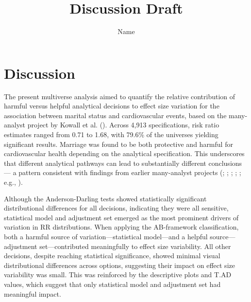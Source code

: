 \documentclass[
  man,
  floatsintext,
  longtable,
  nolmodern,
  notxfonts,
  notimes,
  colorlinks=true,linkcolor=blue,citecolor=blue,urlcolor=blue]{apa7}
\title{Discussion Draft}
\author{Name}
\affiliation{
{Universiteit}}
\newlength{\cslhangindent}
\begin{document}
\maketitle




\setlength\LTleft{0pt}



\ifdefined\Shaded\renewenvironment{Shaded}{\begin{snugshade}\begin{singlespace}}{\end{singlespace}\end{snugshade}}\fi

\setlength{\cslhangindent}{0.5in}

\section{Discussion}\label{discussion}

The present multiverse analysis aimed to quantify the relative
contribution of harmful versus helpful analytical decisions to effect
size variation for the association between marital status and
cardiovascular events, based on the many-analyst project by Kowall et
al. (). Across 4,913
specifications, risk ratio estimates ranged from 0.71 to 1.68, with
79.6\% of the universes yielding significant results. Marriage was found
to be both protective and harmful for cardiovascular health depending on
the analytical specification. This underscores that different analytical
pathways can lead to substantially different conclusions --- a pattern
consistent with findings from earlier many-analyst projects
(;
; ;
;
; e.g.,
).

Although the Anderson-Darling tests showed statistically significant
distributional differences for all decisions, indicating they were all
sensitive, statistical model and adjustment set emerged as the most
prominent drivers of variation in RR distributions. When applying the
AB-framework classification, both a harmful source of
variation---statistical model---and a helpful source---adjustment
set---contributed meaningfully to effect size variability. All other
decisions, despite reaching statistical significance, showed minimal
visual distributional differences across options, suggesting their
impact on effect size variability was small. This was reinforced by the
descriptive plots and T.AD values, which suggest that only statistical
model and adjustment set had meaningful impact.
\end{document}
